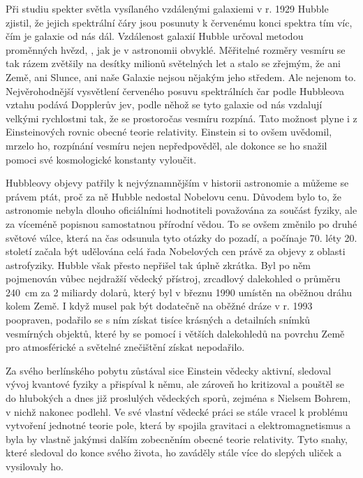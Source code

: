         Při studiu spekter světla vysílaného vzdálenými galaxiemi v r. 1929 Hubble zjistil, že
        jejich spektrální čáry jsou posunuty k červenému konci spektra tím víc, čím je galaxie od
        nás dál. Vzdálenost galaxií Hubble určoval metodou proměnných hvězd, , jak
        je v astronomii obvyklé. Měřitelné rozměry vesmíru se tak rázem zvětšily na desítky milionů
        světelných let a stalo se zřejmým, že ani Země, ani Slunce, ani naše Galaxie nejsou nějakým
        jeho středem. Ale nejenom to. Nejvěrohodnější vysvětlení červeného posuvu spektrálních čar
        podle Hubbleova vztahu podává Dopplerův jev, podle něhož se tyto galaxie od nás vzdalují
        velkými rychlostmi tak, že se prostoročas vesmíru rozpíná. Tato možnost plyne i z
        Einsteinových rovnic obecné teorie relativity. Einstein si to ovšem uvědomil, mrzelo ho,
        rozpínání vesmíru nejen nepředpověděl, ale dokonce se ho snažil pomoci své kosmologické
        konstanty vyloučit.

        Hubbleovy objevy patřily k nejvýznamnějším v historii astronomie a můžeme se právem ptát,
        proč za ně Hubble nedostal Nobelovu cenu. Důvodem bylo to, že astronomie nebyla dlouho
        oficiálními hodnotiteli považována za součást fyziky, ale za víceméně popisnou samostatnou
        přírodní vědou. To se ovšem změnilo po druhé světové válce, která na čas odsunula tyto
        otázky do pozadí, a počínaje 70. léty 20. století začala být udělována celá řada Nobelových
        cen právě za objevy z oblasti astrofyziky. Hubble však přesto nepřišel tak úplně zkrátka.
        Byl po něm pojmenován vůbec nejdražší vědecký přístroj, zrcadlový dalekohled o průměru
        \SI{240}{\cm} za 2 miliardy dolarů, který byl v březnu 1990 umístěn na oběžnou dráhu kolem
        Země. I když musel pak být dodatečně na oběžné dráze v r. 1993 poopraven, podařilo se s ním
        získat tisíce krásných a detailních snímků vesmírných objektů, které by se pomocí i větších
        dalekohledů na povrchu Země pro atmosférické a světelné znečištění získat nepodařilo.

        Za svého berlínského pobytu zůstával sice Einstein vědecky aktivní, sledoval vývoj kvantové
        fyziky a přispíval k němu, ale zároveň ho kritizoval a pouštěl se do hlubokých a dnes již
        proslulých vědeckých sporů, zejména s Nielsem Bohrem, v nichž nakonec podlehl. Ve své
        vlastní vědecké práci se stále vracel k problému vytvoření jednotné teorie pole, která by
        spojila gravitaci a elektromagnetismus a byla by vlastně jakýmsi dalším zobecněním obecné
        teorie relativity. Tyto snahy, které sledoval do konce svého života, ho zaváděly stále více
        do slepých uliček a vysilovaly ho.

